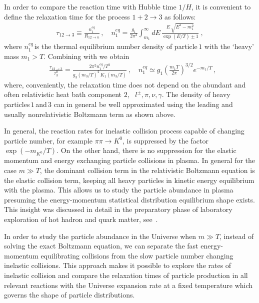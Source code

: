 In order to compare the reaction time with Hubble time $1/H$, it is convenient to define the relaxation time for the process $1+2\rightarrow 3$ as follows:
\begin{align}
\label{Reaction_Time}
\tau_{12\rightarrow 3}\equiv\frac{n^{eq}_{1}}{R_{12\rightarrow n}}\,,\quad
n^{eq}_1=\frac{g_1}{2\pi^2}\int_{m_1}^\infty\!\!\!\!dE\,\frac{E\,\sqrt{E^2-m_1^2}}{\exp{\left(E/T\right)}\pm1}\;, 
\end{align}
where $n^{eq}_1$\,is the thermal equilibrium number density of particle\,$1$ with the `heavy' mass $m_1>T$. Combining  with  we obtain
\begin{align}\label{RelaxationTime}
&\frac{\tau_{12\rightarrow3}}{ \tau^0_3}= 
\frac{2\pi^2 n^{eq}_1/T^3}{g_3(m_3/T)^2\,K_1(m_3/T)}\,, \quad 
n^{eq}_1\simeq g_1\left(\frac{m_1 T}{2\pi}\right)^{3/2}e^{-m_1/T}\,,
\end{align}
where, conveniently, the relaxation time does not depend on the abundant and often relativistic heat bath component $2$, \eg\ $l^\pm,\pi,\nu,\gamma$. The density of heavy particles\,$1$\,and\,$3$ can in general be well approximated using the leading and usually nonrelativistic Boltzmann term as shown above.

In general, the reaction rates for inelastic collision process capable of changing particle number, for example $\pi\pi\to K^0$, is suppressed by the factor $\exp{(-m_{K^0}/T)}$. On the other hand, there is no suppression for the elastic momentum and energy exchanging particle collisions in plasma. In general for the case $m\gg T$, the dominant collision term in the relativistic Boltzmann equation is the elastic collision term, keeping all heavy particles in kinetic energy equilibrium with the plasma. This allows us to study the particle abundance in plasma presuming the energy-momentum statistical distribution  equilibrium shape exists.  This insight was discussed in detail in the preparatory phase of laboratory exploration of hot hadron and quark matter, see~\cite{Koch:1986ud}. 

In order to study the particle abundance in the Universe when $m\gg T$, instead of solving the exact Boltzmann equation, we can separate the fast energy-momentum equilibrating collisions from the slow particle number changing inelastic collisions. This approach makes it possible to explore the rates of inelastic collision and compare the relaxation times of particle production in all relevant reactions with the Universe expansion rate at a fixed temperature which governs the shape of particle distributions.

